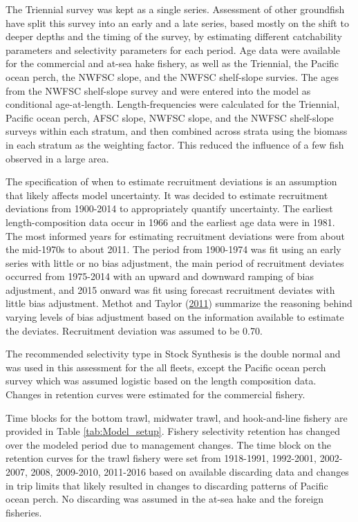 \documentclass[12pt,]{article}
\begin{document}
The Triennial survey was kept as a single series. Assessment of other
groundfish have split this survey into an early and a late series, based
mostly on the shift to deeper depths and the timing of the survey, by
estimating different catchability parameters and selectivity parameters
for each period. Age data were available for the commercial and at-sea
hake fishery, as well as the Triennial, the Pacific ocean perch, the
NWFSC slope, and the NWFSC shelf-slope survies. The ages from the NWFSC
shelf-slope survey and were entered into the model as conditional
age-at-length. Length-frequencies were calculated for the Triennial,
Pacific ocean perch, AFSC slope, NWFSC slope, and the NWFSC shelf-slope
surveys within each stratum, and then combined across strata using the
biomass in each stratum as the weighting factor. This reduced the
influence of a few fish observed in a large area.

The specification of when to estimate recruitment deviations is an
assumption that likely affects model uncertainty. It was decided to
estimate recruitment deviations from 1900-2014 to appropriately quantify
uncertainty. The earliest length-composition data occur in 1966 and the
earliest age data were in 1981. The most informed years for estimating
recruitment deviations were from about the mid-1970s to about 2011. The
period from 1900-1974 was fit using an early series with little or no
bias adjustment, the main period of recruitment deviates occurred from
1975-2014 with an upward and downward ramping of bias adjustment, and
2015 onward was fit using forecast recruitment deviates with little bias
adjustment. Methot and Taylor
(\protect\hyperlink{ref-methot_adjusting_2011}{2011}) summarize the
reasoning behind varying levels of bias adjustment based on the
information available to estimate the deviates. Recruitment deviation
was assumed to be 0.70.

The recommended selectivity type in Stock Synthesis is the double normal
and was used in this assessment for the all fleets, except the Pacific
ocean perch survey which was assumed logistic based on the length
composition data. Changes in retention curves were estimated for the
commercial fishery.

Time blocks for the bottom trawl, midwater trawl, and hook-and-line
fishery are provided in Table \ref{tab:Model_setup}. Fishery selectivity
retention has changed over the modeled period due to management changes.
The time block on the retention curves for the trawl fishery were set
from 1918-1991, 1992-2001, 2002-2007, 2008, 2009-2010, 2011-2016 based
on available discarding data and changes in trip limits that likely
resulted in changes to discarding patterns of Pacific ocean perch. No
discarding was assumed in the at-sea hake and the foreign fisheries.
\end{document}
